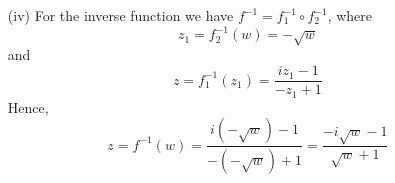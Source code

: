 \begin{itemize}
\begin{itemize}
\item[(iv)]
For the inverse function we have $f^{-1} = f_1^{-1} \circ f_2^{-1}$,
where
\[
z_1 = f_2^{-1}(w) = -\sqrt{w}
\]
and
\[
z = f_1^{-1}(z_1) = \frac{ iz_1 - 1 }{ -z_1 + 1 }
\]
Hence,
\[
z	= f^{-1}(w)
	= \frac{ i(-\sqrt{w}) - 1 }{ -(-\sqrt{w}) + 1 }
	= \frac{ -i\sqrt{w} - 1 }{ \sqrt{w} + 1 }
\]

\end{itemize}

\end{itemize}

